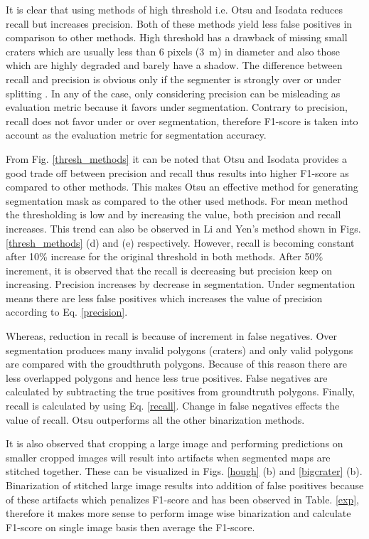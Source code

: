 \documentclass[11pt]{article}
\begin{document}
It is clear that using methods of high threshold i.e. Otsu and Isodata reduces recall but increases precision. Both of these methods yield less false positives in comparison to other methods. High threshold has a drawback of missing small craters which are usually less than 6 pixels (\SI{3}{m}) in diameter and also those which are highly degraded and barely have a shadow. The difference between recall and  precision is obvious only if the segmenter is strongly over or under splitting \cite{badrinarayanan2017segnet}. In any of the case, only considering precision can be misleading as evaluation metric because it favors under segmentation. Contrary to precision, recall does not favor under or over segmentation, therefore F1-score is taken into account as the evaluation metric for segmentation accuracy. 

From Fig. \ref{thresh_methods} it can be noted that Otsu and Isodata provides a good trade off between precision and recall thus results into higher F1-score as compared to other methods. This makes Otsu an effective method for generating segmentation mask as compared to the other used methods. For mean method the thresholding is low and by increasing the value, both precision and recall increases. This trend can also be observed in Li and Yen's method shown in Figs. \ref{thresh_methods} (d) and (e) respectively. However, recall is becoming constant after 10\% increase for the original threshold in both methods. After 50\% increment, it is observed that the recall is decreasing but precision keep on increasing. Precision increases by decrease in segmentation. Under segmentation means there are less false positives which increases the value of precision according to Eq. \ref{precision}. 

Whereas, reduction in recall is because of increment in false negatives. Over segmentation produces many invalid polygons (craters) and only valid polygons are compared with the groudthruth polygons. Because of this reason there are less overlapped polygons and hence less true positives. False negatives are calculated by subtracting the true positives from groundtruth polygons. Finally, recall is calculated by using Eq. \ref{recall}. Change in false negatives effects the value of recall. Otsu outperforms all the other binarization methods.

It is also observed that cropping a large image and performing predictions on smaller cropped images will result into artifacts when segmented maps are stitched together. These can be visualized in Figs. \ref{hough} (b) and \ref{bigcrater} (b). Binarization of stitched large image results into addition of false positives because of these artifacts which penalizes F1-score and has been observed in Table. \ref{exp}, therefore it makes more sense to perform image wise binarization and calculate F1-score on single image basis then average the F1-score.
\end{document}
